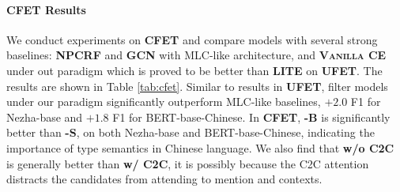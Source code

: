 \begin{table}[t]
\centering
{}
\caption{Micro-averaged results on UFET fine and coarse.}
\label{tab:ufet-coarse-fine}
\end{table}

\paragraph{CFET Results} We conduct experiments on {\bf \textsc{CFET}} and compare {\bf \textsc{\name}} models with several strong baselines:  {\bf \textsc{NPCRF}} and {\bf \textsc{GCN}} with MLC-like architecture, and {\bf \textsc{Vanilla CE}} under out paradigm which is proved to be better than {\bf \textsc{LITE}} on {\bf \textsc{UFET}}. The results are shown in Table \ref{tab:cfet}. Similar to results in {\bf \textsc{UFET}}, filter models under our paradigm significantly outperform MLC-like baselines, $+2.0$ F1 for Nezha-base and $+1.8$ F1 for BERT-base-Chinese. In {\bf \textsc{CFET}}, {\bf \textsc{\name}-B} is significantly better than {\bf \textsc{\name}-S}, on both Nezha-base and BERT-base-Chinese, indicating the importance of type semantics in Chinese language. We also find that {\bf \textsc{\name} w/o C2C} is generally better than  {\bf \textsc{\name} w/ C2C}, it is possibly because the C2C attention distracts the candidates from attending to mention and contexts.
